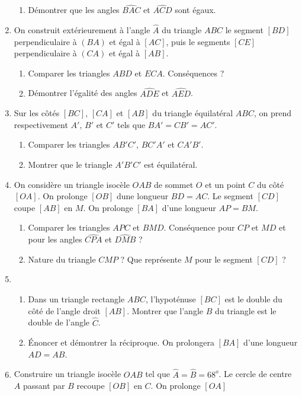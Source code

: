 \begin{enumerate}
\begin{enumerate}
\item Démontrer que les angles $\widehat{BAC}$ et $\widehat{ACD}$ sont égaux.
\end{enumerate}
\item On construit extérieurement à l'angle $\widehat{A}$ du triangle $ABC$ le 
segment $[BD]$ perpendiculaire à $(BA)$ et égal à $[AC]$, puis le segments $[CE]$
perpendiculaire à $(CA)$ et égal à $[AB]$. 
\begin{enumerate}
\item Comparer les triangles $ABD$ et $ECA$. Conséquences ? 
\item Démontrer l'égalité des angles $\widehat{ADE}$ et $\widehat{AED}$.
\end{enumerate}
\item Sur les côtés $[BC]$, $[CA]$ et $[AB]$ du triangle équilatéral $ABC$, 
on prend respectivement $A'$, $B'$ et $C'$ tels que $BA'=CB'=AC'$.\begin{enumerate}
\item Comparer les triangles $AB'C'$, $BC'A'$ et $CA'B'$. 
\item Montrer que le triangle $A'B'C'$ est équilatéral.
\end{enumerate}
\item On considère un triangle isocèle $OAB$ de sommet $O$ et un point $C$ du côté $[OA]$. On prolonge $[OB]$ dune longueur $BD=AC$. Le segment $[CD]$ coupe $[AB]$ en
$M$. On prolonge $[BA]$ d'une longueur $AP=BM$. \begin{enumerate}
\item Comparer les triangles $APC$ et $BMD$. Conséquence pour $CP$ et $MD$ et pour
les angles $\widehat{CPA}$ et $\widehat{DMB}$ ? 
\item Nature du triangle $CMP$ ? Que représente $M$ pour le segment $[CD]$ ?
\end{enumerate}
\item \begin{enumerate} \item Dans un triangle rectangle $ABC$, l'hypoténuse $[BC]$ est le double du côté de l'angle droit $[AB]$. Montrer que l'angle $\widehat{B}$ du triangle est le double 
de l'angle $\widehat{C}$.
\item Énoncer et démontrer la réciproque. On prolongera $[BA]$ d'une longueur $AD=AB$.\end{enumerate}
\item Construire un triangle isocèle $OAB$ tel que $\widehat{A} = \widehat{B}= 68^o$. 
Le cercle de centre $A$ passant par $B$ recoupe $[OB]$ en $C$. On prolonge $[OA]$ 

\end{enumerate}
